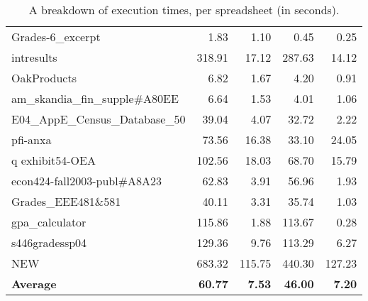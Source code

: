 \begin{table}[!t]
\begin{tabular}{l|r|rrr}
\small{Grades-6\_excerpt} & \small{1.83} & \small{1.10} & \small{0.45} & \small{0.25} \\ 
\small{intresults} & \small{318.91} & \small{17.12} & \small{287.63} & \small{14.12} \\ 
\small{OakProducts} & \small{6.82} & \small{1.67} & \small{4.20} & \small{0.91} \\ 
\small{am\_skandia\_fin\_supple\#A80EE} & \small{6.64} & \small{1.53} & \small{4.01} & \small{1.06} \\ 
\small{E04\_AppE\_Census\_Database\_50} & \small{39.04} & \small{4.07} & \small{32.72} & \small{2.22} \\ 
\small{pfi-anxa} & \small{73.56} & \small{16.38} & \small{33.10} & \small{24.05} \\ 
\small{q exhibit54-OEA} & \small{102.56} & \small{18.03} & \small{68.70} & \small{15.79} \\ 
\small{econ424-fall2003-publ\#A8A23} & \small{62.83} & \small{3.91} & \small{56.96} & \small{1.93} \\ 
\small{Grades\_EEE481\&581} & \small{40.11} & \small{3.31} & \small{35.74} & \small{1.03} \\ 
\small{gpa\_calculator} & \small{115.86} & \small{1.88} & \small{113.67} & \small{0.28} \\ 
\small{s446gradessp04} & \small{129.36} & \small{9.76} & \small{113.29} & \small{6.27} \\ 
\small{NEW} & \small{683.32} & \small{115.75} & \small{440.30} & \small{127.23} \\ 
\small{\bf{Average}} & \small{\bf{60.77}} & \small{\bf{7.53}} & \small{\bf{46.00}} & \small{\bf{7.20}} \\ 

    \end{tabular}%
  \caption{A breakdown of \checkcell{} execution times, per spreadsheet (in seconds).\label{tab:spreadsheet_breakdown}}
\end{table}
